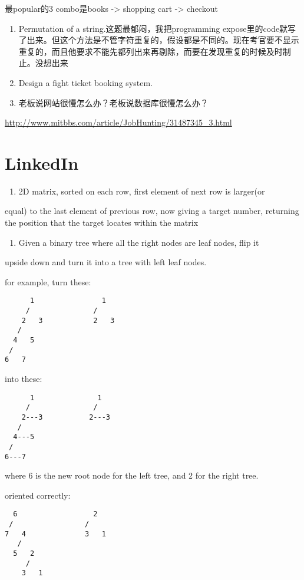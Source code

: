 \documentclass[12pt]{book}
\begin{document}
最popular的3 combo是books -> shopping cart -> checkout

\begin{enumerate}
\item Permutation of a string.这题最郁闷，我把programming expose里的code默写了出来。但这个方法是不管字符重复的，假设都是不同的。现在考官要不显示重复的，而且他要求不能先都列出来再剔除，而要在发现重复的时候及时制止。没想出来

\item Design a fight ticket booking system.

\item 老板说网站很慢怎么办？老板说数据库很慢怎么办？
\end{enumerate}

\url{http://www.mitbbs.com/article/JobHunting/31487345_3.html}

\chapter{LinkedIn}
\label{sec-24}
\begin{enumerate}
\item 2D matrix, sorted on each row, first element of next row is larger(or
\end{enumerate}
equal) to the last element of previous row, now giving a target number, 
returning the position that the target locates within the matrix

\begin{enumerate}
\item Given a binary tree where all the right nodes are leaf nodes, flip it
\end{enumerate}
upside down and turn it into a tree with left leaf nodes.

for example, turn these:
\lstset{language=java,label= ,caption= ,numbers=none}
\begin{lstlisting}
      1                1
     /               / 
    2   3            2   3
   / 
  4   5
 / 
6   7
\end{lstlisting}

into these:
\lstset{language=java,label= ,caption= ,numbers=none}
\begin{lstlisting}
      1               1
     /               /
    2---3           2---3
   /
  4---5
 /
6---7
\end{lstlisting}

where 6 is the new root node for the left tree, and 2 for the right tree.

oriented correctly:
\lstset{language=java,label= ,caption= ,numbers=none}
\begin{lstlisting}
  6                  2
 /                 / 
7   4              3   1
   / 
  5   2
     / 
    3   1
\end{lstlisting}
\end{document}

